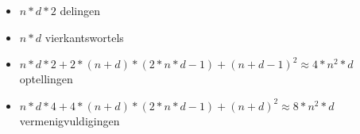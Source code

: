 \documentclass[]{article}
\begin{document}
\begin{itemize}
  \item $n*d*2$ delingen
  \item $n*d$ vierkantswortels
  \item $n*d*2 + 2*(n+d)*(2*n*d-1) + (n+d-1)^2 \approx 4*n^2*d$ optellingen
  \item $n*d*4 + 4*(n+d)*(2*n*d-1) + (n+d)^2 \approx 8*n^2*d$ vermenigvuldigingen
\end{itemize}

\end{document}
